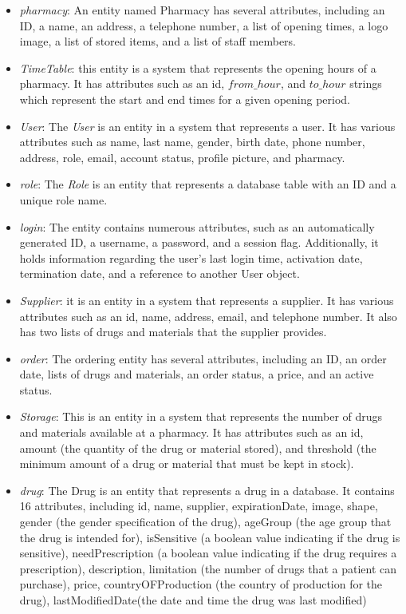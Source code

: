 \begin{itemize}
\item \emph{pharmacy}: An entity named Pharmacy  has several attributes, including an ID, a name, an address, a telephone number, a list of opening times, a logo image, a list of stored items, and a list of staff members.
\item \emph{TimeTable}: this entity is a system that represents the opening hours of a pharmacy. It has attributes such as an id, $from\_hour$, and $to\_hour$ strings which represent the start and end times for a given opening period. 
 \item \emph{User}: The \emph{User} is an entity in a system that represents a user. It has various attributes such as name, last name, gender, birth date, phone number, address, role, email, account status, profile picture, and pharmacy.
 \item \emph{role}: The \emph{Role} is an entity that represents a database table with an ID and a unique role name.
 \item \emph{login}: The entity contains numerous attributes, such as an automatically generated ID, a username, a password, and a session flag. Additionally, it holds information regarding the user's last login time, activation date, termination date, and a reference to another User object. 
  \item \emph{Supplier}: it is an entity in a system that represents a supplier. It has various attributes such as an id, name, address, email, and telephone number. It also has two lists of drugs and materials that the supplier provides.
  \item \emph{order}: The ordering entity  has several attributes, including an ID, an order date, lists of drugs and materials, an order status, a price, and an active status.
  \item \emph{Storage}: This is an entity in a system that represents the number of drugs and materials available at a pharmacy. It has attributes such as an id, amount (the quantity of the drug or material stored), and threshold (the minimum amount of a drug or material that must be kept in stock).
  \item \emph{drug}: The Drug is an entity that represents a drug in a database. It contains 16 attributes, including id, name, supplier, expirationDate, image, shape, gender (the gender specification of the drug), ageGroup (the age group that the drug is intended for), isSensitive (a boolean value indicating if the drug is sensitive), needPrescription (a boolean value indicating if the drug requires a prescription), description, limitation (the number of drugs that a patient can purchase), price, countryOFProduction (the country of production for the drug), lastModifiedDate(the date and time the drug was last modified) 

\end{itemize}
